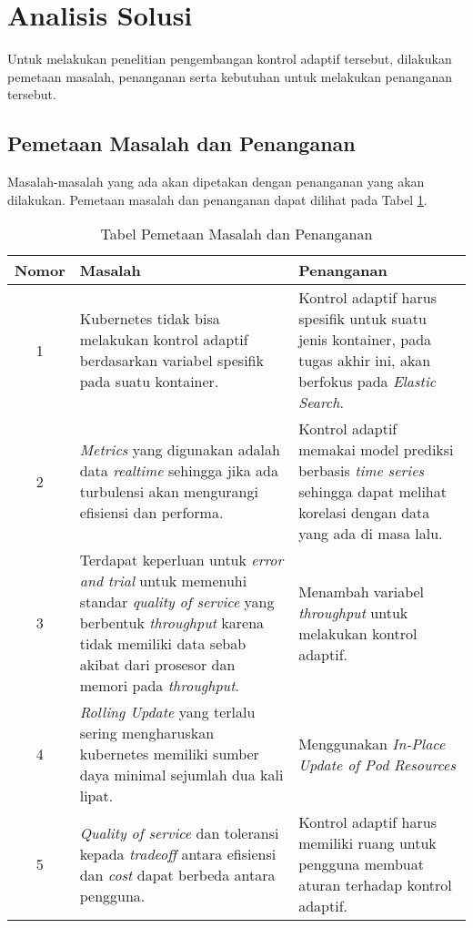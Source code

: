 \section{Analisis Solusi}

Untuk melakukan penelitian pengembangan kontrol adaptif tersebut, dilakukan pemetaan masalah, penanganan serta kebutuhan untuk melakukan penanganan tersebut.

\subsection{Pemetaan Masalah dan Penanganan}
\label{sec:pemetaan-masalah}
Masalah-masalah yang ada akan dipetakan dengan penanganan yang akan dilakukan. Pemetaan masalah dan penanganan dapat dilihat pada Tabel \ref{tab:pemetaan-masalah}.

\begin{table}[h]
    \caption{Tabel Pemetaan Masalah dan Penanganan}
    \vspace{0.25cm}
    \begin{center}
        \begin{tabular}{|c|p{2.5in}|p{2.5in}|}
            \hline
            Nomor & Masalah & Penanganan \tabularnewline
            \hline
            1 &
            Kubernetes tidak bisa melakukan kontrol adaptif berdasarkan variabel spesifik pada suatu kontainer. &
            Kontrol adaptif harus spesifik untuk suatu jenis kontainer, pada tugas akhir ini, akan berfokus pada \textit{Elastic Search}. \tabularnewline
            2 &
            \textit{Metrics} yang digunakan adalah data \textit{realtime} sehingga jika ada turbulensi akan mengurangi efisiensi dan performa. &
            Kontrol adaptif memakai model prediksi berbasis \textit{time series} sehingga dapat melihat korelasi dengan data yang ada di masa lalu.\tabularnewline
            3 & Terdapat keperluan untuk \textit{error and trial} untuk memenuhi standar \textit{quality of service} yang berbentuk \textit{throughput} karena tidak memiliki data sebab akibat dari prosesor dan memori pada \textit{throughput}. &
            Menambah variabel \textit{throughput} untuk melakukan kontrol adaptif.
            \tabularnewline
            4 & \textit{Rolling Update} yang terlalu sering mengharuskan kubernetes memiliki sumber daya minimal sejumlah dua kali lipat. &
            Menggunakan \textit{In-Place Update of Pod Resources} \tabularnewline
            5 & \textit{Quality of service} dan toleransi kepada \textit{tradeoff} antara efisiensi dan \textit{cost} dapat berbeda antara pengguna. &
            Kontrol adaptif harus memiliki ruang untuk pengguna membuat aturan terhadap kontrol adaptif.\tabularnewline
            \hline
        \end{tabular}
    \end{center}
    \label{tab:pemetaan-masalah}
\end{table}